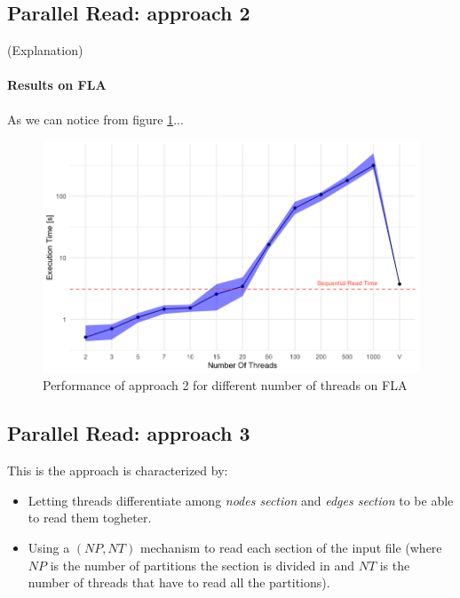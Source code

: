 \documentclass[twocolumn, switch]{article} %
\begin{document}
\subsection{Parallel Read: approach 2}
(Explanation)
\paragraph{Results on FLA} 
As we can notice from figure \ref{parread2time}...
\begin{figure}[ht!]
  \centering
  \includegraphics[width=1\linewidth]{par_read_2_time.png}
  \caption{Performance of approach 2 for different number of threads on FLA}
  \label{parread2time}
\end{figure}
\subsection{Parallel Read: approach 3}
This is the approach is characterized by:
\begin{itemize}
  \item Letting threads differentiate among \textit{nodes section} and 
        \textit{edges section} to be able to read them togheter.
  \item Using a $(NP, NT)$ mechanism to read each section of the input file (where
        $NP$ is the number of partitions the section is divided in and $NT$ is the number
        of threads that have to read all the partitions).
\end{itemize}
\end{document}
